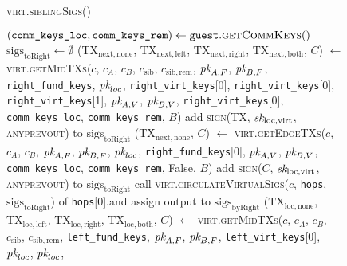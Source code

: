 \begin{figure}[H]
  \begin{processbox}{\textsc{virt.siblingSigs}()}
    \begin{algorithmic}[1]
      \State $(\texttt{comm\_keys\_loc}, \texttt{comm\_keys\_rem}) \gets
      \texttt{guest}.\textsc{getCommKeys}()$
      \State $\mathrm{sigs}_{\mathrm{toRight}} \gets \emptyset$
       
        \State ($\mathrm{TX}_{\mathrm{next}, \mathrm{none}}$,
        $\mathrm{TX}_{\mathrm{next}, \mathrm{left}}$,
        $\mathrm{TX}_{\mathrm{next}, \mathrm{right}}$,
        $\mathrm{TX}_{\mathrm{next}, \mathrm{both}}$, $C$) $\gets$
        \textsc{virt.getMidTXs}($c$, $c_A$, $c_B$, $c_{\mathrm{sib}}$,
        $c_{\mathrm{sib}, \mathrm{rem}}$, $\textit{pk}_{A, F}$, $\textit{pk}_{B, F}$,
        \texttt{right\_fund\_keys}, $\textit{pk}_{loc}$, \texttt{right\_virt\_keys}[0],
        \texttt{right\_virt\_keys}[0], \texttt{right\_virt\_keys}[1], $\textit{pk}_{A,
        V}$, $\textit{pk}_{B, V}$, \texttt{right\_virt\_keys}[0],
        \texttt{comm\_keys\_loc}, \texttt{comm\_keys\_rem}, $B$)
          \State add \textsc{sign}(TX, $\textit{sk}_{\mathrm{loc}, \mathrm{virt}}$,
          \textsc{anyprevout}) to $\mathrm{sigs}_{\mathrm{toRight}}$
        \EndFor
      \Else \: 
        \State ($\mathrm{TX}_{\mathrm{next}, \mathrm{none}}$, $C$) $\gets$
        \textsc{virt.getEdgeTXs}($c$, $c_A$, $c_B$, $\textit{pk}_{A, F}$, $\textit{pk}_{B, F}$,
        $\textit{pk}_{loc}$, \texttt{right\_fund\_keys}[0], $\textit{pk}_{A, V}$, $\textit{pk}_{B, V}$,
        \texttt{comm\_keys\_loc}, \texttt{comm\_keys\_rem}, False, $B$)
        \State add \textsc{sign}($C$, $\textit{sk}_{\mathrm{loc}, \mathrm{virt}}$,
        \textsc{anyprevout}) to $\mathrm{sigs}_{\mathrm{toRight}}$
      \EndIf
      \State call \textsc{virt.circulateVirtualSigs}($c$, \texttt{hops},
      $\mathrm{sigs}_{\mathrm{toRight}}$) of \texttt{hops}[0].\bob and assign
      output to $\mathrm{sigs}_{\mathrm{byRight}}$
      \State ($\mathrm{TX}_{\mathrm{loc}, \mathrm{none}}$,
      $\mathrm{TX}_{\mathrm{loc}, \mathrm{left}}$, $\mathrm{TX}_{\mathrm{loc},
      \mathrm{right}}$, $\mathrm{TX}_{\mathrm{loc}, \mathrm{both}}$, $C$)
      $\gets$ \textsc{virt.getMidTXs}($c$, $c_A$, $c_B$, $c_{\mathrm{sib}}$,
      $c_{\mathrm{sib}, \mathrm{rem}}$, \texttt{left\_fund\_keys}, $\textit{pk}_{A, F}$,
      $\textit{pk}_{B, F}$, \texttt{left\_virt\_keys}[0], $\textit{pk}_{loc}$, $\textit{pk}_{loc}$,

\end{algorithmic}
\end{processbox}
\end{figure}
